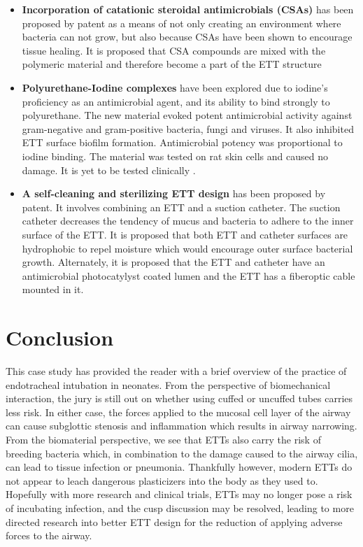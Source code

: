 \documentclass[12pt, openany, oneside]{book}
\begin{document}
\begin{itemize}
\item{{\bf{Incorporation of catationic steroidal antimicrobials (CSAs)}} has been proposed by patent as a means of not only creating an environment where bacteria can not grow, but also because CSAs have been shown to encourage tissue healing. It is proposed that CSA compounds are mixed with the polymeric material and therefore become a part of the ETT structure \citep{genberg2017novel}}
\item{{\bf{Polyurethane-Iodine complexes}} have been explored due to iodine's proficiency as an antimicrobial agent, and its ability to bind strongly to polyurethane. The new material evoked potent antimicrobial activity against gram-negative and gram-positive bacteria, fungi and viruses. It also inhibited ETT surface biofilm formation. Antimicrobial potency was proportional to iodine binding. The material was tested on rat skin cells and caused no damage. It is yet to be tested clinically \citep{luo2010antimicrobial}.}
\item{{\bf{A self-cleaning and sterilizing ETT design}} has been proposed by patent. It involves combining an ETT and a suction catheter. The suction catheter decreases the tendency of mucus and bacteria to adhere to the inner surface of the ETT. It is proposed that both ETT and catheter surfaces are hydrophobic to repel moisture which would encourage outer surface bacterial growth. Alternately, it is proposed that the ETT and catheter have an antimicrobial photocatylyst coated lumen and the ETT has a fiberoptic cable mounted in it. \citep{rao2013self}}

\end{itemize}


\section{Conclusion}
This case study has provided the reader with a brief overview of the practice of endotracheal intubation in neonates. From the perspective of biomechanical interaction, the jury is still out on whether using cuffed or uncuffed tubes carries less risk. In either case, the forces applied to the mucosal cell layer of the airway can cause subglottic stenosis and inflammation which results in airway narrowing. From the biomaterial perspective, we see that ETTs also carry the risk of breeding bacteria which, in combination to the damage caused to the airway cilia, can lead to tissue infection or pneumonia. Thankfully however, modern ETTs do not appear to leach dangerous plasticizers into the body as they used to. Hopefully with more research and clinical trials, ETTs may no longer pose a risk of incubating infection, and the cusp discussion may be resolved, leading to more directed research into better ETT design for the reduction of applying adverse forces to the airway. 
\end{document}
